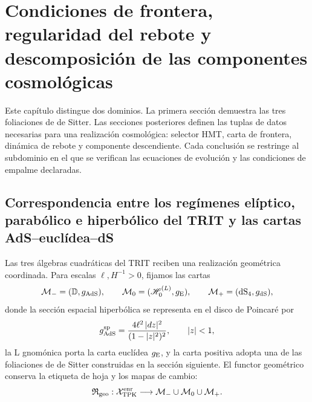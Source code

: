 
\section{Condiciones de frontera, regularidad del rebote y descomposición de las componentes cosmológicas}
\label{chap:cosmologia-frontera-rebote}

Este capítulo distingue dos dominios. La primera sección demuestra las tres
foliaciones de de Sitter. Las secciones posteriores definen las tuplas de
datos necesarias para una realización cosmológica: selector HMT, carta de
frontera, dinámica de rebote y componente descendiente. Cada conclusión se
restringe al subdominio en el que se verifican las ecuaciones de evolución y
las condiciones de empalme declaradas.

\subsection{Correspondencia entre los regímenes elíptico, parabólico e hiperbólico del TRIT y las cartas AdS–euclídea–dS}
\label{sec:atlas-ads-euclideo-ds-hmt}

Las tres álgebras cuadráticas del TRIT reciben una realización geométrica
coordinada. Para escalas \(\ell,H^{-1}>0\), fijamos las cartas
\[
 \mathcal M_-=(\mathbb D, g_{\rm AdS}),
 \qquad
 \mathcal M_0=(\mathscr H_0^{(L)},g_{\rm E}),
 \qquad
 \mathcal M_+=(\mathrm{dS}_4,g_{\rm dS}),
\]
donde la sección espacial hiperbólica se representa en el disco de Poincaré
por
\[
 g_{\rm AdS}^{\rm sp}
 =\frac{4\ell^2\,|dz|^2}{(1-|z|^2)^2},
 \qquad |z|<1,
\]
la L gnomónica porta la carta euclídea \(g_{\rm E}\), y la carta positiva
adopta una de las foliaciones de de Sitter construidas en la sección
siguiente. El functor geométrico conserva la etiqueta de hoja y los mapas de
cambio:
\[
 \mathfrak R_{\rm geo}:\mathcal X_{\rm TPK}^{\rm enr}
 \longrightarrow
 \mathcal M_-\cup\mathcal M_0\cup\mathcal M_+.
\]

